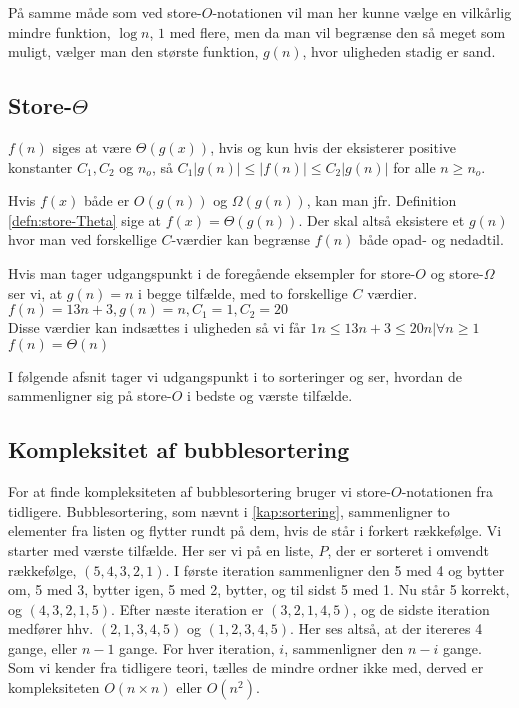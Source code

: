 På samme måde som ved store-$O$-notationen vil man her kunne vælge en vilkårlig mindre funktion, $\log n$, $1$ med flere, men da man vil begrænse den så meget som muligt, vælger man den største funktion, $g(n)$, hvor uligheden stadig er sand.
\subsection{Store-$\Theta$}
\begin{defn} \label{defn:store-Theta}
$f(n)$ siges at være $\Theta(g(x))$, hvis og kun hvis der eksisterer positive konstanter $C_1, C_2$ og $n_o$, så $C_1|g(n)| \leq |f(n)| \leq C_2|g(n)|$ for alle $n \geq n_o$.
\end{defn}
Hvis $f(x)$ både er $O(g(n))$ og $\Omega(g(n))$, kan man jfr. Definition \ref{defn:store-Theta} sige at $f(x) = \Theta(g(n))$. 
Der skal altså eksistere et $g(n)$ hvor man ved forskellige $C$-værdier kan begrænse $f(n)$ både opad- og nedadtil. 
\begin{exmp}
Hvis man tager udgangspunkt i de foregående eksempler for store-$O$ og store-$\Omega$ ser vi, at $g(n) = n$ i begge tilfælde, med to forskellige $C$ værdier. \\
$f(n)=13n+3, g(n)=n, C_1=1, C_2=20$ \\
Disse værdier kan indsættes i uligheden så vi får $1n \leq 13n+3 \leq 20n| \forall n \geq 1$ \\
$f(n)= \Theta(n)$
\end{exmp}

I følgende afsnit tager vi udgangspunkt i to sorteringer og ser, hvordan de sammenligner sig på store-$O$ i bedste og værste tilfælde.

\subsection{Kompleksitet af bubblesortering} \label{kap:kom_bubble}

For at finde kompleksiteten af bubblesortering bruger vi store-$O$-notationen fra tidligere. 
Bubblesortering, som nævnt i \autoref{kap:sortering}, sammenligner to elementer fra listen og flytter rundt på dem, hvis de står i forkert rækkefølge.
Vi starter med værste tilfælde. Her ser vi på en liste, $P$, der er sorteret i omvendt rækkefølge, $(5,4,3,2,1)$.
I første iteration sammenligner den 5 med 4 og bytter om, 5 med 3, bytter igen, 5 med 2, bytter, og til sidst 5 med 1. Nu står 5 korrekt, og $(4, 3, 2, 1, 5)$.
Efter næste iteration er $(3, 2, 1, 4, 5)$, og de sidste iteration medfører hhv. $(2, 1, 3, 4, 5)$ og $(1, 2, 3, 4, 5)$. Her ses altså, at der itereres 4 gange, eller $n-1$ gange. 
For hver iteration, $i$, sammenligner den $n-i$ gange. 
Som vi kender fra tidligere teori, tælles de mindre ordner ikke med, derved er kompleksiteten $O(n\times n)$ eller $O(n^2)$.

